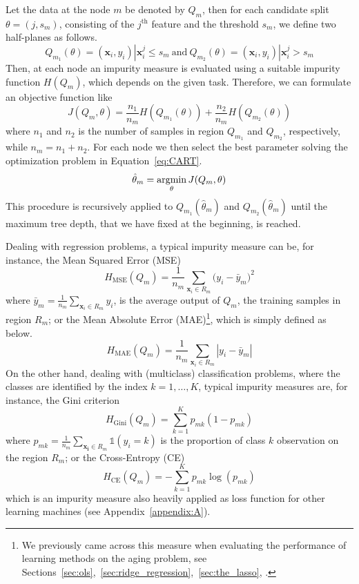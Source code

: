 		Let the data at the node $m$ be denoted by $Q_m$, then for each candidate split $\theta=(j, s_m)$, consisting of the $j^{\text{th}}$ feature and the threshold $s_m$, we define two half-planes as follows.
		$$
		Q_{m_1}(\theta) = (\bm{x}_i, y_i) | \bm{x}_i^j \leq s_m~\text{and}~Q_{m_2}(\theta) = (\bm{x}_i, y_i) | \bm{x}_i^j > s_m
		$$
		Then, at each node an impurity measure is evaluated using a suitable impurity function $H(Q_m)$, which depends on the given task. Therefore, we can formulate an objective function like
		$$
		J(Q_m,\theta) = \frac{n_1}{n_m}H(Q_{m_1}(\theta)) + \frac{n_2}{n_m}H(Q_{m_2}(\theta))
		$$
		where $n_1$ and $n_2$ is the number of samples in region $Q_{m_1}$ and $Q_{m_2}$, respectively, while $n_m=n_1+n_2$.
		For each node we then select the best parameter solving the optimization problem in Equation~\eqref{eq:CART}.
		\begin{equation} \label{eq:CART}
			\hat \theta_m = \mathop{\mathrm{argmin}}\limits_{\theta} J(Q_m,\theta)
		\end{equation}
		This procedure is recursively applied to $Q_{m_1}(\hat \theta_m)$ and $Q_{m_2}(\hat \theta_m)$ until the maximum tree depth, that we have fixed at the beginning, is reached.
		
		Dealing with regression problems, a typical impurity measure can be, for instance, the Mean Squared Error (\ac{MSE})
		\begin{equation} \label{eq:MSE}
			H_{\text{MSE}}(Q_m) = \frac{1}{n_m} \sum_{\bm{x}_i \in R_m} \big(y_i - \bar y_m \big)^2
		\end{equation}
		where $\bar y_m = \frac{1}{n_m} \sum_{\bm{x}_i \in R_m} y_i$, is the average output of $Q_m$, \ie the training samples in region $R_m$;
		or the Mean Absolute Error (\ac{MAE})\footnote{ We previously came across this measure when evaluating the performance of learning methods on the aging problem, see Sections~\ref{sec:ols},~\ref{sec:ridge_regression},~\ref{sec:the_lasso}, \etc.}, which is simply defined as below.
		\begin{equation} \label{eq:MAE}
				H_{\text{MAE}}(Q_m) = \frac{1}{n_m} \sum_{\bm{x}_i \in R_m} | y_i - \bar y_m |
		\end{equation}
		On the other hand, dealing with (multiclass) classification problems, where the classes are identified by the index $k=1,\dots,K$, typical impurity measures are, for instance, the Gini criterion
		\begin{equation} \label{eq:gini}
			H_{\text{Gini}}(Q_m) = \sum_{k=1}^K p_{mk}(1-p_{mk})
		\end{equation}
		where $p_{mk}=\frac{1}{n_m} \sum_{\bm{x_i} \in R_m} \mathds{1}(y_i = k)$ is the proportion of class $k$ observation on the region $R_m$; or the Cross-Entropy (\ac{CE})
		\begin{equation} \label{eq:ce}
			H_{\text{CE}}(Q_m) = - \sum_{k=1}^K p_{mk} \log(p_{mk})
		\end{equation}
		which is an impurity measure also heavily applied as loss function for other  learning machines (see Appendix~\ref{appendix:A}).
		
